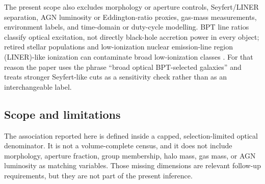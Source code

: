 \documentclass[twocolumn]{aastex631}
\begin{document}
The present scope also excludes morphology or aperture controls, Seyfert/LINER separation, AGN luminosity or Eddington-ratio proxies, gas-mass measurements, environment labels, and time-domain or duty-cycle modelling. BPT line ratios classify optical excitation, not directly black-hole accretion power in every object; retired stellar populations and low-ionization nuclear emission-line region (LINER)-like ionization can contaminate broad low-ionization classes \citep{stasinska2008,stasinska2015}. For that reason the paper uses the phrase ``broad optical BPT-selected galaxies'' and treats stronger Seyfert-like cuts as a sensitivity check rather than as an interchangeable label.

\subsection{Scope and limitations}
The association reported here is defined inside a capped, selection-limited optical denominator. It is not a volume-complete census, and it does not include morphology, aperture fraction, group membership, halo mass, gas mass, or AGN luminosity as matching variables. Those missing dimensions are relevant follow-up requirements, but they are not part of the present inference.
\end{document}
